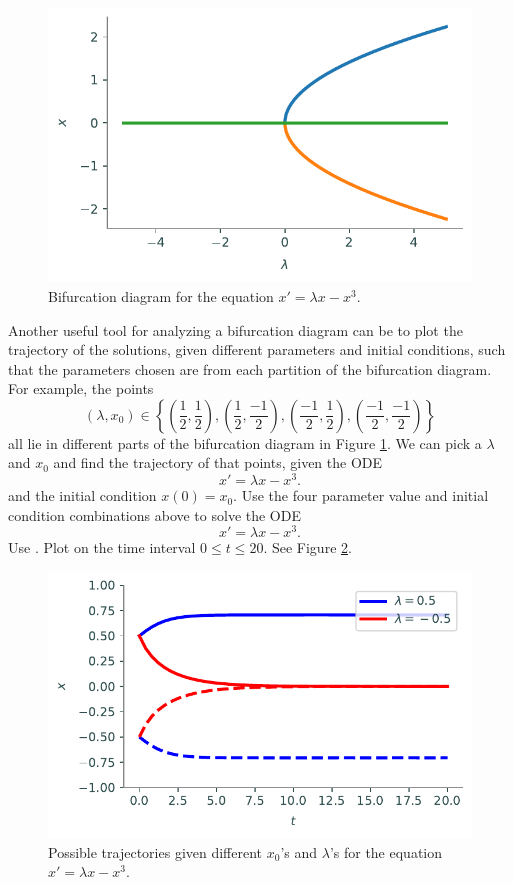 \begin{figure}[H]
\centering
\includegraphics[width=\textwidth]{figures/prob1.pdf}
\caption{Bifurcation diagram for the equation $x' = \lambda x - x^3$.}
\label{prob1}
\end{figure}

\begin{problem}
Another useful tool for analyzing a bifurcation diagram can be to plot the trajectory of the solutions, given different parameters and initial conditions, such that the parameters chosen are from each partition of the bifurcation diagram. For example, the points
\[(\lambda, x_0)\in \left\{\left(\frac{1}{2},\frac{1}{2}\right), \left(\frac{1}{2},\frac{-1}{2}\right), \left(\frac{-1}{2},\frac{1}{2}\right), \left(\frac{-1}{2},\frac{-1}{2}\right) \right\} \]
all lie in different parts of the bifurcation diagram in Figure \ref{prob1}. We can pick a $\lambda$ and $x_0$ and find the trajectory of that points, given the ODE
\[x' = \lambda x-x^3.\]
and the initial condition $x(0)=x_0$. 
Use the four parameter value and initial condition combinations above to solve the ODE 
\[x' = \lambda x-x^3.\]
Use . Plot on the time interval $0\leq t \leq 20$.
See Figure \ref{fig:hysteresis:pitchfork_state_space}.
\end{problem}

\begin{figure}[H]
\centering
\includegraphics[width=\textwidth]{figures/pitchfork_state_space.pdf}
\caption{Possible trajectories given different $x_0$'s and $\lambda$'s for the equation $x' = \lambda x - x^3$.}
\label{fig:hysteresis:pitchfork_state_space}
\end{figure}

